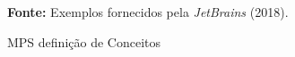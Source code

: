 \begin{figure}[h!]
\centering

\caption{\textmd{MPS definição de Conceitos}}
\label{fig:mpsconceitos}

\par\medskip\textbf{Fonte:} Exemplos fornecidos pela \textit{JetBrains} (2018). \par\medskip
\end{figure}
